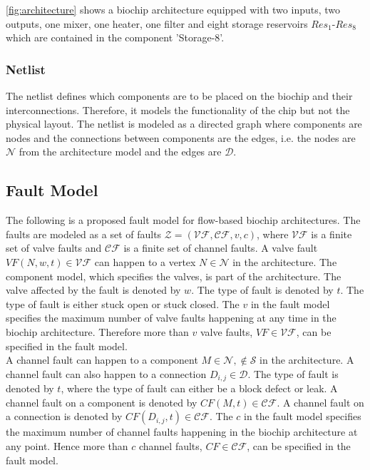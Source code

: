 \autoref{fig:architecture} shows a biochip architecture equipped with two inputs, two outputs, one mixer, one heater, one filter and eight storage reservoirs $Res_1$-$Res_8$ which are contained in the component 'Storage-8'.


\subsubsection{Netlist}
The netlist defines which components are to be placed on the biochip and their interconnections. Therefore, it models the functionality of the chip but not the physical layout. The netlist is modeled as a directed graph where components are nodes and the connections between components are the edges, i.e. the nodes are $\mathcal{N}$ from the architecture model and the edges are $\mathcal{D}$.

\subsection{Fault Model}
\label{sec:fault-model}
The following is a proposed fault model for flow-based biochip architectures. The faults are modeled as a set of faults $\mathcal{Z} = (\mathcal{VF}, \mathcal{CF}, v, c)$, where $\mathcal{VF}$ is a finite set of valve faults and $\mathcal{CF}$ is a finite set of channel faults. A valve fault $VF(N, w, t) \in \mathcal{VF}$ can happen to a vertex $N \in \mathcal{N}$ in the architecture. The component model, which specifies the valves, is part of the architecture. The valve affected by the fault is denoted by $w$. The type of fault is denoted by $t$. The type of fault is either stuck open or stuck closed. The $v$ in the fault model specifies the maximum number of valve faults happening at any time in the biochip architecture. Therefore more than $v$ valve faults, $VF \in \mathcal{VF}$, can be specified in the fault model.\\
A channel fault can happen to a component $M \in \mathcal{N}, \notin \mathcal{S}$ in the architecture. A channel fault can also happen to a connection $D_{i, j} \in \mathcal{D}$. The type of fault is denoted by $t$, where the type of fault can either be a block defect or leak. A channel fault on a component is denoted by $CF(M, t) \in \mathcal{CF}$. A channel fault on a connection is denoted by $CF(D_{i, j}, t) \in \mathcal{CF}$. The $c$ in the fault model specifies the maximum number of channel faults happening in the biochip architecture at any point. Hence more than $c$ channel faults, $CF \in \mathcal{CF}$, can be specified in the fault model.

